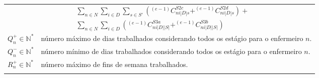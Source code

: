 \documentclass[cic,tc, twoside]{iiufrgs}
\begin{document}
\begin{table}[H]
\begin{tabularx}{\linewidth}{l@{}X}
						& ~~~~~~~~~~$ \sum_{n \in N} \sum_{i \in D} \sum_{s \in S'}\left(^{(e-1)}C^{S2c}_{ni|D|s} + ^{(e-1)}C^{S2d}_{ni|D|s}\right) + $ \\
						& ~~~~~~~~~~$ \sum_{n \in N} \sum_{i \in D} \left(^{(e-1)}C^{S3a}_{ni|D||S|} + ^{(e-1)}C^{S3b}_{ni|D||S|} \right)$ \\
$Q^+_{n} \in \mathbb{N^*}$   & número máximo de dias trabalhados considerando todos os estágio para o enfermeiro $n$.\\
$Q^-_{n} \in \mathbb{N^*}$   & número mínimo de dias trabalhados considerando todos os estágio para o enfermeiro $n$.\\
$R^+_{n} \in \mathbb{N^*}$   & número máximo de fins de semana trabalhados.\\

\noalign{\smallskip}\hline
\end{tabularx}
\label{tab:parametros}
\end{table}
\end{document}
